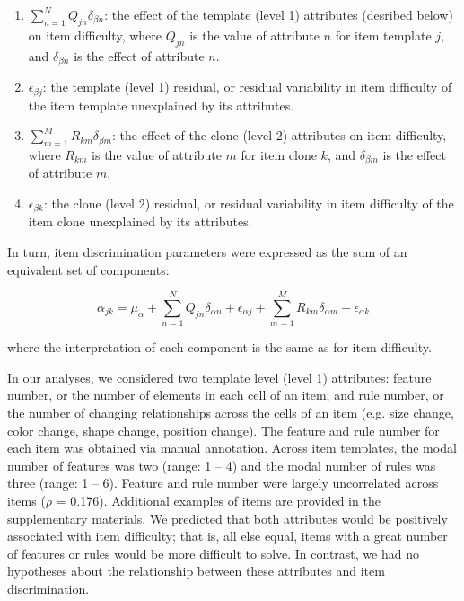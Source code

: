 \documentclass[a4paper,man,natbib]{apa6}
\begin{document}
\begin{enumerate}

\item $\sum_{n=1}^N Q_{jn} \delta_{\beta n}$: the effect of the template (level 1) attributes (desribed below) on item difficulty, where $Q_{jn}$ is the value of attribute $n$ for item template $j$, and $\delta_{\beta n}$ is the effect of attribute $n$. 

\item $\epsilon_{\beta j}$: the template (level 1) residual, or residual variability in item difficulty of the item template unexplained by its attributes.

\item $\sum_{m=1}^M R_{km} \delta_{\beta m}$: the effect of the clone (level 2) attributes on item difficulty, where $R_{km}$ is the value of attribute $m$ for item clone $k$, and $\delta_{\beta m}$ is the effect of attribute $m$. 

\item $\epsilon_{\beta k}$: the clone (level 2) residual, or residual variability in item difficulty of the item clone unexplained by its attributes.

\end{enumerate}

\noindent In turn, item discrimination parameters were expressed as the sum of an equivalent set of components:

\begin{equation}
\alpha_{jk} = \mu_\alpha + \sum_{n=1}^N Q_{jn} \delta_{\alpha n} + \epsilon_{\alpha j} + \sum_{m=1}^M R_{km} \delta_{\alpha m} + \epsilon_{\alpha k}
\end{equation}

\noindent where the interpretation of each component is the same as for item difficulty.

In our analyses, we considered two template level (level 1) attributes: feature number, or the number of elements in each cell of an item; and rule number, or the number of changing relationships across the cells of an item (e.g. size change, color change, shape change, position change). The feature and rule number for each item was obtained via manual annotation. Across item templates, the modal number of features was two (range: 1 -- 4) and the modal number of rules was three (range: 1 -- 6). Feature and rule number were largely uncorrelated across items ($\rho$ = 0.176). Additional examples of items are provided in the supplementary materials. We predicted that both attributes would be positively associated with item difficulty; that is, all else equal, items with a great number of features or rules would be more difficult to solve. In contrast, we had no hypotheses about the relationship between these attributes and item discrimination. 
\end{document}
